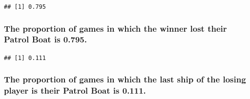 \documentclass[
]{article}
\newenvironment{Shaded}{\begin{snugshade}}{\end{snugshade}}
\newcommand{\CommentTok}[1]{\textcolor[rgb]{0.56,0.35,0.01}{\textit{#1}}}
\newcommand{\ControlFlowTok}[1]{\textcolor[rgb]{0.13,0.29,0.53}{\textbf{#1}}}
\newcommand{\DecValTok}[1]{\textcolor[rgb]{0.00,0.00,0.81}{#1}}
\newcommand{\FunctionTok}[1]{\textcolor[rgb]{0.13,0.29,0.53}{\textbf{#1}}}
\newcommand{\NormalTok}[1]{#1}
\newcommand{\OtherTok}[1]{\textcolor[rgb]{0.56,0.35,0.01}{#1}}
\newcommand{\SpecialCharTok}[1]{\textcolor[rgb]{0.81,0.36,0.00}{\textbf{#1}}}
\begin{document}
\begin{verbatim}
## [1] 0.795
\end{verbatim}

\subsubsection{The proportion of games in which the winner lost their
Patrol Boat is
0.795.}\label{the-proportion-of-games-in-which-the-winner-lost-their-patrol-boat-is-0.795.}

\begin{Shaded}
\end{Shaded}

\begin{verbatim}
## [1] 0.111
\end{verbatim}

\subsubsection{The proportion of games in which the last ship of the
losing player is their Patrol Boat is
0.111.}\label{the-proportion-of-games-in-which-the-last-ship-of-the-losing-player-is-their-patrol-boat-is-0.111.}
\end{document}
